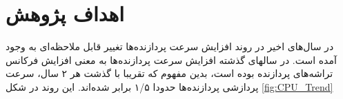 
\section{اهداف پژوهش}
در سال‌های اخیر در روند افزایش سرعت پردازنده‌ها تغییر قابل ملاحظه‌ای به وجود آمده است. در سالهای گذشته افزایش سرعت پردازنده‌ها به معنی افزایش فرکانس تراشه‌های پردازنده بوده است، بدین مفهوم که تقریبا با گذشت هر ۲ سال،‌ سرعت پردازشی پردازنده‌ها حدودا ۱/۵ برابر شده‌اند. این روند در شکل 
\ref{fig:CPU_Trend}
